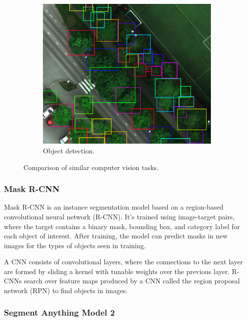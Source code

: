 \documentclass[english, 12pt, a4paper, sci, utf8, a-2b, online]{aaltothesis}
\begin{document}
\begin{figure}[h]
    \begin{subfigure}[b]{0.32\textwidth}
        \includegraphics[width=1.0\textwidth]{figures/task-comparison/obj-det.png}
        \caption{Object detection.}
    \end{subfigure}
    \caption{Comparison of similar computer vision tasks.}
    \label{fig:task-comparison}
\end{figure}

\subsubsection{Mask R-CNN}

Mask R-CNN is an instance segmentation model based on a region-based convolutional neural network (R-CNN). It's trained using image-target pairs, where the target contains a binary mask, bounding box, and category label for each object of interest. After training, the model can predict masks in new images for the types of objects seen in training.

A CNN consists of convolutional layers, where the connections to the next layer are formed by sliding a kernel with tunable weights over the previous layer. R-CNNs search over feature maps produced by a CNN called the region proposal network (RPN) to find objects in images.

\subsubsection{Segment Anything Model 2}
\end{document}
